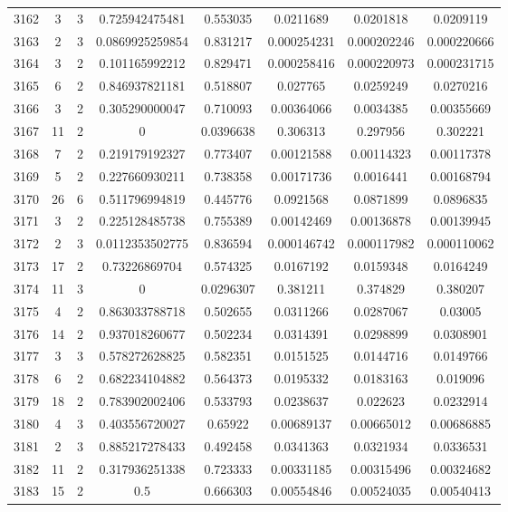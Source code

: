 \begin{longtable}{|c|c|c|c|c|c|c|c|}
3162 & 3 & 3 & 0.725942475481 & 0.553035 & 0.0211689 & 0.0201818 & 0.0209119 \\
3163 & 2 & 3 & 0.0869925259854 & 0.831217 & 0.000254231 & 0.000202246 & 0.000220666 \\
3164 & 3 & 2 & 0.101165992212 & 0.829471 & 0.000258416 & 0.000220973 & 0.000231715 \\
3165 & 6 & 2 & 0.846937821181 & 0.518807 & 0.027765 & 0.0259249 & 0.0270216 \\
3166 & 3 & 2 & 0.305290000047 & 0.710093 & 0.00364066 & 0.0034385 & 0.00355669 \\
3167 & 11 & 2 & 0 & 0.0396638 & 0.306313 & 0.297956 & 0.302221 \\
3168 & 7 & 2 & 0.219179192327 & 0.773407 & 0.00121588 & 0.00114323 & 0.00117378 \\
3169 & 5 & 2 & 0.227660930211 & 0.738358 & 0.00171736 & 0.0016441 & 0.00168794 \\
3170 & 26 & 6 & 0.511796994819 & 0.445776 & 0.0921568 & 0.0871899 & 0.0896835 \\
3171 & 3 & 2 & 0.225128485738 & 0.755389 & 0.00142469 & 0.00136878 & 0.00139945 \\
3172 & 2 & 3 & 0.0112353502775 & 0.836594 & 0.000146742 & 0.000117982 & 0.000110062 \\
3173 & 17 & 2 & 0.73226869704 & 0.574325 & 0.0167192 & 0.0159348 & 0.0164249 \\
3174 & 11 & 3 & 0 & 0.0296307 & 0.381211 & 0.374829 & 0.380207 \\
3175 & 4 & 2 & 0.863033788718 & 0.502655 & 0.0311266 & 0.0287067 & 0.03005 \\
3176 & 14 & 2 & 0.937018260677 & 0.502234 & 0.0314391 & 0.0298899 & 0.0308901 \\
3177 & 3 & 3 & 0.578272628825 & 0.582351 & 0.0151525 & 0.0144716 & 0.0149766 \\
3178 & 6 & 2 & 0.682234104882 & 0.564373 & 0.0195332 & 0.0183163 & 0.019096 \\
3179 & 18 & 2 & 0.783902002406 & 0.533793 & 0.0238637 & 0.022623 & 0.0232914 \\
3180 & 4 & 3 & 0.403556720027 & 0.65922 & 0.00689137 & 0.00665012 & 0.00686885 \\
3181 & 2 & 3 & 0.885217278433 & 0.492458 & 0.0341363 & 0.0321934 & 0.0336531 \\
3182 & 11 & 2 & 0.317936251338 & 0.723333 & 0.00331185 & 0.00315496 & 0.00324682 \\
3183 & 15 & 2 & 0.5 & 0.666303 & 0.00554846 & 0.00524035 & 0.00540413 \\

\end{longtable}
